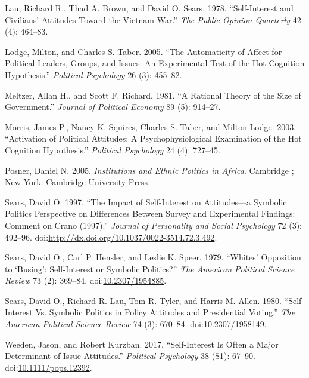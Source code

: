 \documentclass[]{article}
\begin{document}
\hypertarget{ref-lau_self-interest_1978}{}
Lau, Richard R., Thad A. Brown, and David O. Sears. 1978.
``Self-Interest and Civilians' Attitudes Toward the Vietnam War.''
\emph{The Public Opinion Quarterly} 42 (4): 464--83.

\hypertarget{ref-lodge_automaticity_2005}{}
Lodge, Milton, and Charles S. Taber. 2005. ``The Automaticity of Affect
for Political Leaders, Groups, and Issues: An Experimental Test of the
Hot Cognition Hypothesis.'' \emph{Political Psychology} 26 (3): 455--82.

\hypertarget{ref-meltzer_rational_1981}{}
Meltzer, Allan H., and Scott F. Richard. 1981. ``A Rational Theory of
the Size of Government.'' \emph{Journal of Political Economy} 89 (5):
914--27.

\hypertarget{ref-morris_activation_2003}{}
Morris, James P., Nancy K. Squires, Charles S. Taber, and Milton Lodge.
2003. ``Activation of Political Attitudes: A Psychophysiological
Examination of the Hot Cognition Hypothesis.'' \emph{Political
Psychology} 24 (4): 727--45.

\hypertarget{ref-posner_institutions_2005}{}
Posner, Daniel N. 2005. \emph{Institutions and Ethnic Politics in
Africa}. Cambridge ; New York: Cambridge University Press.

\hypertarget{ref-sears_impact_1997}{}
Sears, David O. 1997. ``The Impact of Self-Interest on Attitudes---a
Symbolic Politics Perspective on Differences Between Survey and
Experimental Findings: Comment on Crano (1997).'' \emph{Journal of
Personality and Social Psychology} 72 (3): 492--96.
doi:\href{https://doi.org/http://dx.doi.org/10.1037/0022-3514.72.3.492}{http://dx.doi.org/10.1037/0022-3514.72.3.492}.

\hypertarget{ref-sears_whites_1979}{}
Sears, David O., Carl P. Hensler, and Leslie K. Speer. 1979. ``Whites'
Opposition to `Busing': Self-Interest or Symbolic Politics?'' \emph{The
American Political Science Review} 73 (2): 369--84.
doi:\href{https://doi.org/10.2307/1954885}{10.2307/1954885}.

\hypertarget{ref-sears_self-interest_1980}{}
Sears, David O., Richard R. Lau, Tom R. Tyler, and Harris M. Allen.
1980. ``Self-Interest Vs. Symbolic Politics in Policy Attitudes and
Presidential Voting.'' \emph{The American Political Science Review} 74
(3): 670--84.
doi:\href{https://doi.org/10.2307/1958149}{10.2307/1958149}.

\hypertarget{ref-weeden_self-interest_2017}{}
Weeden, Jason, and Robert Kurzban. 2017. ``Self-Interest Is Often a
Major Determinant of Issue Attitudes.'' \emph{Political Psychology} 38
(S1): 67--90.
doi:\href{https://doi.org/10.1111/pops.12392}{10.1111/pops.12392}.
\end{document}
